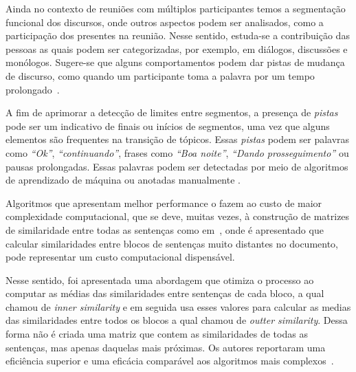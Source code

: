 Ainda no contexto de reuniões com múltiplos participantes temos a segmentação funcional dos discursos, onde outros aspectos podem ser analisados, como a participação dos presentes na reunião. Nesse sentido, estuda-se a contribuição das pessoas as quais podem ser categorizadas,  por exemplo, em diálogos, discussões e monólogos. Sugere-se que alguns comportamentos podem dar pistas de mudança de discurso, como quando um participante toma a palavra por um tempo prolongado~\cite{Bokaei2015}. 


%

A fim de aprimorar a detecção de limites entre segmentos, a presença de \textit{pistas} pode ser um indicativo de finais ou inícios de segmentos, uma vez que alguns elementos são frequentes na transição de tópicos. Essas \textit{pistas} podem ser palavras como \textit{``Ok''}, \textit{``continuando''}, frases como \textit{``Boa noite''}, \textit{``Dando prosseguimento''} ou pausas prolongadas. Essas palavras podem ser detectadas por meio de algoritmos de aprendizado de máquina ou anotadas manualmente
\cite{Hsueh2006} %
\cite{Galley2003} 
\cite{Beeferman1999}
.


Algoritmos que apresentam melhor performance o fazem ao custo de maior complexidade computacional, que se deve, muitas vezes, à construção de matrizes de similaridade entre todas as sentenças como em~\cite{Choi2000}, onde é apresentado que calcular similaridades entre blocos de sentenças muito distantes no documento, pode representar um custo computacional dispensável. %

Nesse sentido, foi apresentada uma abordagem que otimiza o processo ao computar as médias das similaridades entre sentenças de cada bloco, a qual chamou de \textit{inner similarity} e em seguida usa esses valores para calcular as medias das similaridades entre todos os blocos a qual chamou de \textit{outter similarity}. Dessa forma não é criada uma matriz que contem as similaridades de todas as sentenças, mas apenas daquelas mais próximas. Os autores reportaram uma eficiência superior e uma eficácia comparável aos algoritmos mais complexos~\cite{Kern2009}.

